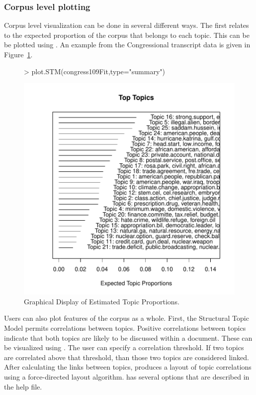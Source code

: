 \documentclass[nojss]{jss}
\begin{document}
\subsubsection{Corpus level plotting}

Corpus level visualization can be done in several different ways. The first relates to the expected proportion of the corpus that belongs to each topic. This can be be plotted using . An example from the Congressional transcript data is given in Figure~\ref{fig:summary}.

\begin{figure}[t!]
\begin{center}
\begin{Schunk}
\begin{Sinput}
> plot.STM(congress109Fit,type="summary")
\end{Sinput}
\end{Schunk}
\includegraphics{stmVignette-019}
\caption{Graphical Display of Estimated Topic Proportions.}
\label{fig:summary}
\end{center}
\end{figure}

Users can also plot features of the corpus as a whole. First, the Structural Topic Model permits correlations between topics. Positive correlations between topics indicate that both topics are likely to be discussed within a document. These can be visualized using . The user can specify a correlation threshold.  If two topics are correlated above that threshold, than those two topics are considered linked.  After calculating the links between topics,  produces a layout of topic correlations using a force-directed layout algorithm.  has several options that are described in the help file.
\end{document}
